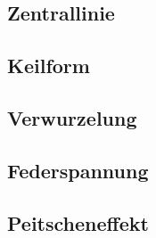 \subsection{Zentrallinie}

\subsection{Keilform}

\subsection{Verwurzelung}

\subsection{Federspannung}

\subsection{Peitscheneffekt}